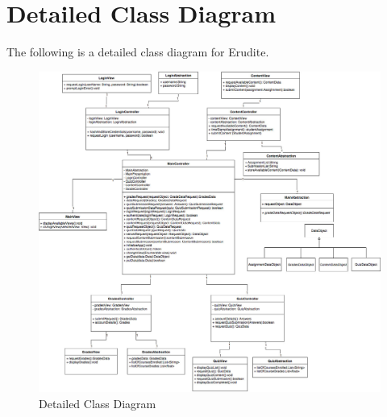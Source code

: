 \documentclass[]{article}
\begin{document}
\section{Detailed Class Diagram}
\label{sec:detailed_class_diagram}
The following is a detailed class diagram for Erudite.
\begin{figure}[H]
  \centering
  \includegraphics[scale=0.40]{A3_Assets/DetailedClassDiagram.jpg}
  \caption{Detailed Class Diagram}
\end{figure}


\newpage
\appendix
\end{document}
